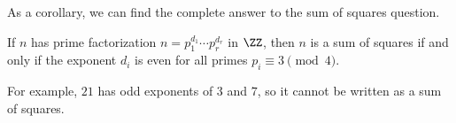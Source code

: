 

As a corollary, we can find the complete answer to the sum of squares question. 

\begin{corollary}
If $n$ has prime factorization $n = p_1^{d_1}\cdots p_r^{d_r}$ in $\ZZ$, then $n$ is a sum of squares if and only if the exponent $d_i$ is even for all primes $p_i \equiv 3 \pmod{4}$. 
\end{corollary}

For example, $21$ has odd exponents of $3$ and $7$, so it cannot be written as a sum of squares. 

